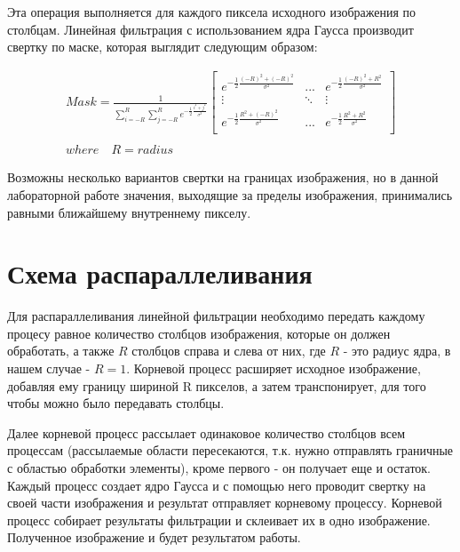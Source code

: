 \documentclass{report}
\begin{document}
\par Эта операция выполняется для каждого пиксела исходного изображения по столбцам. Линейная фильтрация с использованием ядра Гаусса производит свертку по маске, которая выглядит следующим образом:

\begin{gather}
Mask = \frac{1}{\sum\limits_{i = -R}^{R}\sum\limits_{j = -R}^{R}e^{-\frac{1}{2}\frac{i^2 + j^2}{\sigma^{2}}}} \begin{bmatrix} e^{-\frac{1}{2}\frac{(-R)^2 + (-R)^2}{\sigma^{2}}}& ...& e^{-\frac{1}{2}\frac{(-R)^2 + R^2}{\sigma^{2}}}\\ \vdots& \ddots& \vdots\\ e^{-\frac{1}{2}\frac{R^2 + (-R)^2}{\sigma^{2}}}& ...& e^{-\frac{1}{2}\frac{R^2 + R^2}{\sigma^{2}}}\\ \end{bmatrix}\\ \\ where\quad R = radius
\end{gather}

\par Возможны несколько вариантов свертки на границах изображения, но в данной лабораторной работе значения, выходящие за пределы изображения, принимались равными ближайшему внутреннему пикселу.
\newpage

\section*{Схема распараллеливания}
\par Для распараллеливания линейной фильтрации необходимо передать каждому процесу равное количество столбцов изображения, которые он должен обработать, а также $R$ столбцов справа и слева от них, где $R$ - это радиус ядра, в нашем случае - $R = 1$. Корневой процесс расширяет исходное изображение, добавляя ему границу шириной R пикселов, а затем транспонирует, для того чтобы можно было передавать столбцы.
\par Далее корневой процесс рассылает одинаковое количество столбцов всем процессам (рассылаемые области пересекаются, т.к. нужно отправлять граничные с областью обработки элементы), кроме первого - он получает еще и остаток. Каждый процесс создает ядро Гаусса и с помощью него проводит свертку на своей части изображения и результат отправляет корневому процессу. Корневой процесс собирает результаты фильтрации и склеивает их в одно изображение. Полученное изображение и будет результатом работы.
\newpage
\end{document}
